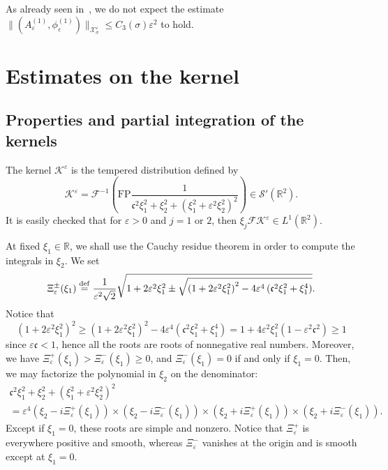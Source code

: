 \documentclass[AHL,Unicode,longabstracts,published]{cedram}
\newcommand*\R{\mathbb R}
\newcommand*\ddef{\stackrel{\rm def}{=}}
\newcommand{\FP}{\mathrm{FP}}
\newcommand*\BK{\mathcal{K}}
\newcommand*\BX{\mathcal{X}}
\newcommand*\Fou{\mathscr{F}}
\newcommand*\Sch{\mathscr{S}}
\newcommand*\cs{{\mathfrak c}}
\newcommand*\gs{\geqslant }
\newcommand*\ls{\leqslant }
\newcommand*\e{\varepsilon}
\newcommand*\s{\sigma}
\begin{document}
\begin{rema}
As already seen in~\cite{Cerror}, we do not expect the estimate $ \| (A^{(1)}_\e, \phi^{(1)}_\e) \|_{ \BX^\e_{\s} } \ls C_3 (\s) \e^2 $ to hold.
\end{rema}



\section{Estimates on the kernel}



\subsection{Properties and partial integration of the kernels}

The kernel $ \BK^\e $ is the tempered distribution defined by
\[
\BK^\e = \Fou^{-1} \left(
\FP \frac{1}{ \cs^2 \xi_1^2 + \xi_2^2 + \left(\xi_1^2 + \e^2 \xi_2^2\right)^2 } \right)
\in \Sch'(\R^2).
\]
It is easily checked that for $ \e > 0 $ and $ j =1 $ or $2$, then $ \xi_j \Fou \BK^\e \in L^1(\R^2) $.

At fixed $ \xi_1 \in \R $, we shall use the Cauchy residue theorem in order to compute the integrals in $ \xi_2 $. We set
\[
\Xi_\e^\pm (\xi_1) \ddef \frac{1}{\e^2 \sqrt{2} }
\sqrt{ 1+ 2\e^2 \xi_1^2
\pm \sqrt{\left(1+ 2\e^2 \xi_1^2\right)^2 - 4 \e^4 \left(\cs^2 \xi_1^2 + \xi_1^4\right) } }.
\]
Notice that
\[
\left(1+ 2\e^2 \xi_1^2\right)^2
\gs \left(1+ 2\e^2 \xi_1^2\right)^2 - 4 \e^4 \left(\cs^2 \xi_1^2 + \xi_1^4\right) = 1 + 4 \e^2 \xi_1^2 \left(1 - \e^2 \cs^2\right)
\gs 1
\]
since $ \e \cs < 1 $, hence all the roots are roots of nonnegative real numbers. Moreover, we have $ \Xi_\e^+ (\xi_1) > \Xi_\e^- (\xi_1) \gs 0 $, and $ \Xi_\e^- (\xi_1) = 0 $ if and only if $ \xi_1 = 0 $. Then, we may factorize the polynomial in $ \xi_2 $ on the denominator:
\begin{multline*}
\cs^2 \xi_1^2 + \xi_2^2 + \left(\xi_1^2 + \e^2 \xi_2^2\right)^2 \\
= \e^4 \left(\xi_2 - i \Xi_\e^+ (\xi_1)\right) \times \left(\xi_2 - i \Xi_\e^- (\xi_1)\right)
\times \left(\xi_2 + i \Xi_\e^+ (\xi_1)\right) \times \left(\xi_2 + i \Xi_\e^- (\xi_1)\right).
\end{multline*}
Except if $ \xi_1 = 0 $, these roots are simple and nonzero. Notice that $ \Xi_\e^+ $ is everywhere positive and smooth, whereas $ \Xi_\e^- $ vanishes at the origin and is smooth except at $ \xi_1 = 0 $.
\end{document}
